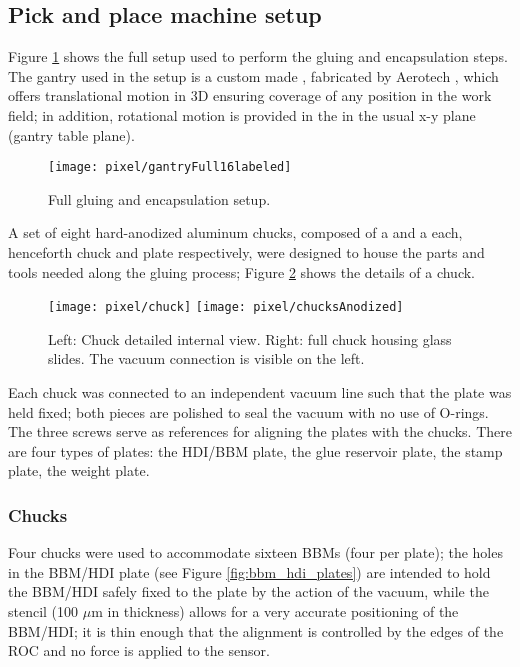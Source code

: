 \subsection{Pick and place machine setup}\label{sec:setup}

Figure \ref{fig:setup} shows the full setup used to perform the gluing and encapsulation steps. The gantry used in the setup is a custom made , fabricated by Aerotech \cite{aerotech}, which offers translational motion in 3D ensuring coverage of any position in the work field; in addition, rotational motion is provided in the  in the usual x-y plane (gantry table plane).

\begin{figure}[!h]
  \centering
  \texttt{[image: pixel/gantryFull16labeled]}
  \caption[Full gluing and encapsulation setup]{Full gluing and encapsulation setup. }\label{fig:setup}
\end{figure}

A set of eight hard-anodized aluminum chucks, composed of a  and a  each, henceforth chuck and plate respectively, were designed to house the parts and tools needed along the gluing process; Figure \ref{fig:chuck} shows the details of a chuck.      

\begin{figure}[!h]
  \centering
  \texttt{[image: pixel/chuck]}
  \texttt{[image: pixel/chucksAnodized]}
  \caption[Bare and full chucks]{Left: Chuck detailed internal view. Right: full chuck housing glass slides. The vacuum connection is visible on the left.}\label{fig:chuck}
\end{figure}

Each chuck was connected to an independent vacuum line such that the plate was held fixed; both pieces are polished to seal the vacuum with no use of O-rings. The three screws serve as references for aligning the plates with the chucks. There are four types of plates: the HDI/BBM plate, the glue reservoir plate, the stamp plate, the weight plate.

\subsubsection*{Chucks}

Four chucks were used to accommodate sixteen BBMs (four per plate); the holes in the BBM/HDI plate (see Figure \ref{fig:bbm_hdi_plates}) are intended to hold the BBM/HDI safely fixed to the plate by the action of the vacuum, while the stencil (100 $\mu$m in thickness) allows for a very accurate positioning of the BBM/HDI; it is thin enough that the alignment is controlled by the edges of the ROC and no force is applied to the sensor.     

